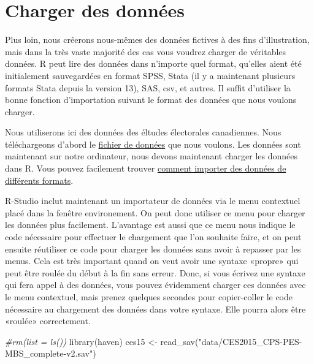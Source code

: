 \documentclass[
]{book}
\newenvironment{Shaded}{\begin{snugshade}}{\end{snugshade}}
\newcommand{\CommentTok}[1]{\textcolor[rgb]{0.56,0.35,0.01}{\textit{#1}}}
\newcommand{\FunctionTok}[1]{\textcolor[rgb]{0.00,0.00,0.00}{#1}}
\newcommand{\NormalTok}[1]{#1}
\newcommand{\OtherTok}[1]{\textcolor[rgb]{0.56,0.35,0.01}{#1}}
\newcommand{\StringTok}[1]{\textcolor[rgb]{0.31,0.60,0.02}{#1}}
\begin{document}
\hypertarget{charger-des-donnuxe9es}{%
\section{Charger des données}\label{charger-des-donnuxe9es}}

Plus loin, nous créerons nous-mêmes des données fictives à des fins d'illustration, mais dans la très vaste majorité des cas vous voudrez charger de véritables données. R peut lire des données dans n'importe quel format, qu'elles aient été initialement sauvegardées en format SPSS, Stata (il y a maintenant plusieurs formats Stata depuis la version 13), SAS, csv, et autres. Il suffit d'utiliser la bonne fonction d'importation suivant le format des données que nous voulons charger.

Nous utiliserons ici des données des éltudes électorales canadiennes. Nous téléchargeons d'abord le \href{https://ces-eec.sites.olt.ubc.ca/files/2016/07/CES2015-phone-release.zip}{fichier de données} que nous voulons. Les données sont maintenant sur notre ordinateur, nous devons maintenant charger les données dans R. Vous pouvez facilement trouver \href{https://www.r-bloggers.com/this-r-data-import-tutorial-is-everything-you-need/}{comment importer des données de différents formats}.

R-Studio inclut maintenant un importateur de données via le menu contextuel placé dans la fenêtre environement. On peut donc utiliser ce menu pour charger les données plus facilement. L'avantage est aussi que ce menu nous indique le code nécessaire pour effectuer le chargement que l'on souhaite faire, et on peut ensuite réutiliser ce code pour charger les données sans avoir à repasser par les menus. Cela est très important quand on veut avoir une syntaxe «propre» qui peut être roulée du début à la fin sans erreur. Donc, si vous écrivez une syntaxe qui fera appel à des données, vous pouvez évidemment charger ces données avec le menu contextuel, mais prenez quelques secondes pour copier-coller le code nécessaire au chargement des données dans votre syntaxe. Elle pourra alors être «roulée» correctement.

\begin{Shaded}
\begin{Highlighting}[]
\CommentTok{\#rm(list = ls())}
\FunctionTok{library}\NormalTok{(haven)}
\NormalTok{ces15 }\OtherTok{\textless{}{-}} \FunctionTok{read\_sav}\NormalTok{(}\StringTok{"data/CES2015\_CPS{-}PES{-}MBS\_complete{-}v2.sav"}\NormalTok{)}
\end{Highlighting}
\end{Shaded}
\end{document}
